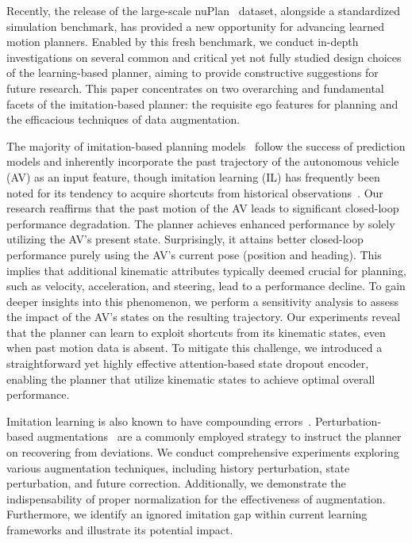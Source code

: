 \documentclass[letterpaper, 10 pt, conference]{ieeeconf}  %
\begin{document}
Recently, the release of the large-scale nuPlan~\cite{caesar2021nuplan} dataset, alongside a standardized simulation benchmark, has provided a new opportunity for advancing learned motion planners.
Enabled by this fresh benchmark, we conduct in-depth investigations on several common and critical 
yet not fully studied design choices of the learning-based planner, aiming to provide constructive suggestions for future research. 
This paper concentrates on two overarching and fundamental facets of the imitation-based planner: the requisite ego features for planning and the efficacious techniques of data augmentation. 

The majority of imitation-based planning models~\cite{zhou2021exploring, scheel2022urban,cheng2022mpnp,pini2023safepathnet,vitelli2022safetynet,huang2023gameformer,huang2023dipp} follow the success of prediction models and inherently incorporate the past trajectory of the autonomous vehicle (AV) as an input feature, though imitation learning (IL) has frequently been noted for its tendency to acquire shortcuts from historical observations~\cite{bansal2018chauffeurnet, muller2005offroad, wang2019monocular,wen2020fighting}. Our research reaffirms that the past motion of the AV leads to significant closed-loop performance degradation. 
The planner achieves enhanced performance by solely utilizing the AV's present state. 
Surprisingly, it attains better closed-loop performance purely using the AV's current pose (position and heading). 
This implies that additional kinematic attributes typically deemed crucial for planning, such as velocity, acceleration, and steering, lead to a performance decline. To gain deeper insights into this phenomenon, we perform a sensitivity analysis to assess the impact of the AV's states on the resulting trajectory. Our experiments reveal that the planner can learn to exploit shortcuts from its kinematic states, even when past motion data is absent. To mitigate this challenge, we introduced a straightforward yet highly effective attention-based state dropout encoder, enabling the planner that utilize kinematic states to achieve optimal overall performance.

Imitation learning is also known to have compounding errors~\cite{ross2011reduction}. Perturbation-based augmentations~\cite{bansal2018chauffeurnet,zhou2021exploring,vitelli2022safetynet} are a commonly employed strategy to instruct the planner on recovering from deviations. We conduct comprehensive experiments exploring various augmentation techniques, including history perturbation, state perturbation, and future correction. Additionally, we demonstrate the indispensability of proper normalization for the effectiveness of augmentation. Furthermore, we identify an ignored imitation gap within current learning frameworks and illustrate its potential impact.  
\end{document}
